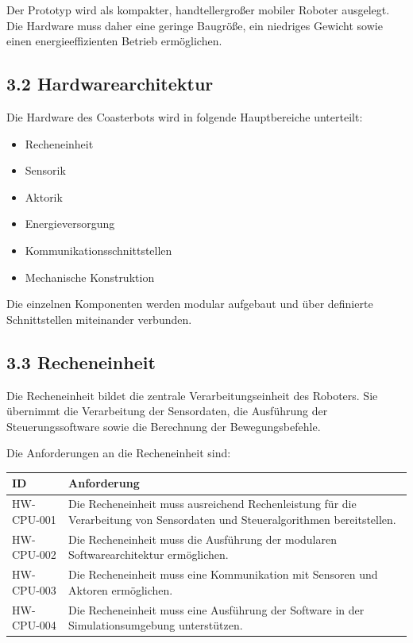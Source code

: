 \documentclass[
  a4paper,
  12pt,
  DIV=12,        %
  parskip=half,  %
  headings=small %
]{scrartcl}
\theoremstyle{definition}
\providecommand{\tightlist}{%
  \setlength{\itemsep}{0pt}\setlength{\parskip}{0pt}}
\theoremstyle{definition}
\providecommand{\tightlist}{%
  \setlength{\itemsep}{0pt}\setlength{\parskip}{0pt}}
\begin{document}
Der Prototyp wird als kompakter, handtellergroßer mobiler Roboter
ausgelegt. Die Hardware muss daher eine geringe Baugröße, ein niedriges
Gewicht sowie einen energieeffizienten Betrieb ermöglichen.

\subsection{3.2 Hardwarearchitektur}\label{hardwarearchitektur}

Die Hardware des Coasterbots wird in folgende Hauptbereiche unterteilt:

\begin{itemize}
\tightlist
\item
  Recheneinheit
\item
  Sensorik
\item
  Aktorik
\item
  Energieversorgung
\item
  Kommunikationsschnittstellen
\item
  Mechanische Konstruktion
\end{itemize}

Die einzelnen Komponenten werden modular aufgebaut und über definierte
Schnittstellen miteinander verbunden.

\subsection{3.3 Recheneinheit}\label{recheneinheit}

Die Recheneinheit bildet die zentrale Verarbeitungseinheit des Roboters.
Sie übernimmt die Verarbeitung der Sensordaten, die Ausführung der
Steuerungssoftware sowie die Berechnung der Bewegungsbefehle.

Die Anforderungen an die Recheneinheit sind:

\begin{longtable}[]{@{}
  >{\raggedright\arraybackslash}p{}
  >{\raggedright\arraybackslash}p{}@{}}
\toprule\noalign{}
\begin{minipage}[b]{\linewidth}\raggedright
ID
\end{minipage} & \begin{minipage}[b]{\linewidth}\raggedright
Anforderung
\end{minipage} \\
\midrule\noalign{}
\endhead
\bottomrule\noalign{}
\endlastfoot
HW-CPU-001 & Die Recheneinheit muss ausreichend Rechenleistung für die
Verarbeitung von Sensordaten und Steueralgorithmen bereitstellen. \\
HW-CPU-002 & Die Recheneinheit muss die Ausführung der modularen
Softwarearchitektur ermöglichen. \\
HW-CPU-003 & Die Recheneinheit muss eine Kommunikation mit Sensoren und
Aktoren ermöglichen. \\
HW-CPU-004 & Die Recheneinheit muss eine Ausführung der Software in der
Simulationsumgebung unterstützen. \\
\end{longtable}
\end{document}
